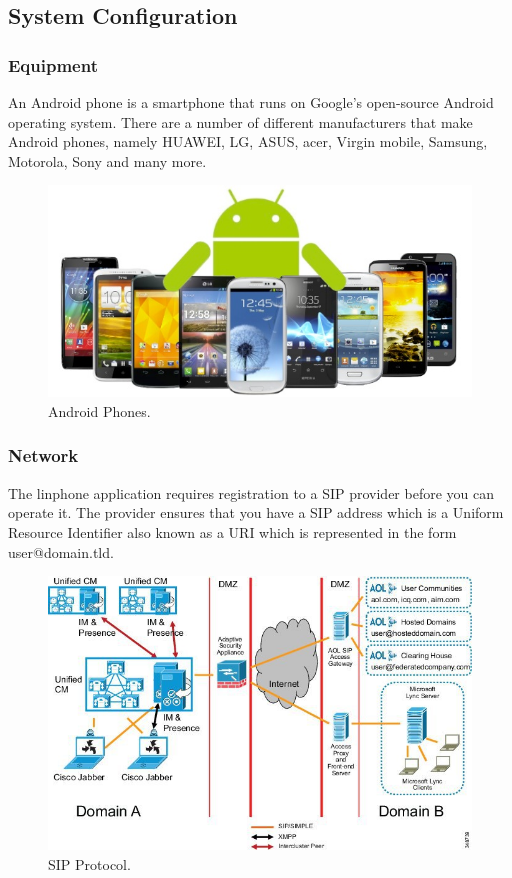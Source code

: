 \documentclass[a4paper]{article}
\begin{document}
\subsection{System Configuration}

\subsubsection{Equipment}
An Android phone is a smartphone that runs on Google's open-source Android operating system. There are a number of different manufacturers that make Android phones, namely HUAWEI, LG, ASUS, acer, Virgin mobile, Samsung, Motorola, Sony and many more.\\

\begin{center}
\begin{figure}[h]
\centering
\includegraphics[width=0.7\linewidth]{./pictures/android.jpg}
\caption{\label{fig:Agile}Android Phones.}
\end{figure}
\end{center}

\subsubsection{Network}
The linphone application requires registration to a SIP provider before you can operate it. The provider ensures that you have a SIP address which is a Uniform Resource Identifier also known as a URI which is represented in the form user@domain.tld. \\


\begin{center}
\begin{figure}[h]
\centering
\includegraphics[width=0.7\linewidth]{./pictures/sip.jpg}
\caption{\label{fig:Agile}SIP Protocol.}
\end{figure}
\end{center}
\end{document}
